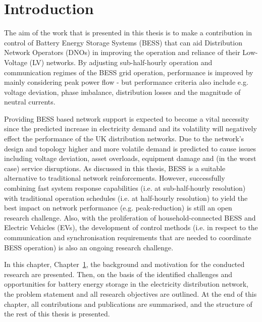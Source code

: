 \chapter{Introduction}
\label{ch-introduction}

The aim of the work that is presented in this thesis is to make a contribution in control of Battery Energy Storage Systems (BESS) that can aid Distribution Network Operators (DNOs) in improving the operation and reliance of their Low-Voltage (LV) networks.
By adjusting sub-half-hourly operation and communication regimes of the BESS grid operation, performance is improved by mainly considering peak power flow - but performance criteria also include e.g. voltage deviation, phase imbalance, distribution losses and the magnitude of neutral currents.

Providing BESS based network support is expected to become a vital necessity since the predicted increase in electricity demand and its volatility will negatively effect the performance of the UK distribution networks.
Due to the network's design and topology higher and more volatile demand is predicted to cause issues including voltage deviation, asset overloads, equipment damage and (in the worst case) service disruptions.
As discussed in this thesis, BESS is a suitable alternative to traditional network reinforcements.
However, successfully combining fast system response capabilities (i.e. at sub-half-hourly resolution) with traditional operation schedules (i.e. at half-hourly resolution) to yield the best impact on network performance (e.g. peak-reduction) is still an open research challenge.
Also, with the proliferation of household-connected BESS and Electric Vehicles (EVs), the development of control methods (i.e. in respect to the communication and synchronisation requirements that are needed to coordinate BESS operation) is also an ongoing research challenge.

In this chapter, Chapter~\ref{ch-introduction}, the background and motivation for the conducted research are presented.
Then, on the basis of the identified challenges and opportunities for battery energy storage in the electricity distribution network, the problem statement and all research objectives are outlined.
At the end of this chapter, all contributions and publications are summarised, and the structure of the rest of this thesis is presented.









